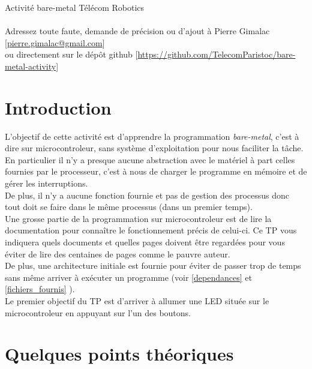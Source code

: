 \documentclass[a4paper,10pt]{article} %
\begin{document}
\LARGE
Activité bare-metal \hfill Télécom Robotics\\\\
\small Adressez toute faute, demande de précision ou d'ajout à Pierre Gimalac [\href{mailto:pierre.gimalac@gmail.com}{pierre.gimalac@gmail.com}]\\
ou directement sur le dépôt github [\href{https://github.com/TelecomParistoc/bare-metal-activity}{https://github.com/TelecomParistoc/bare-metal-activity}]

\normalsize
\renewcommand{\contentsname}{Sommaire}
\thispagestyle{empty}
\tableofcontents
\thispagestyle{empty}

\section{Introduction}
L'objectif de cette activité est d'apprendre la programmation \textit{bare-metal}, c'est à dire sur microcontroleur, sans système d'exploitation pour nous faciliter la tâche.\\

En particulier il n'y a presque aucune abstraction avec le matériel à part celles fournies par le processeur, c'est à nous de charger le programme en mémoire et de gérer les interruptions.\\

De plus, il n'y a aucune fonction fournie et pas de gestion des processus donc tout doit se faire dans le même processus (dans un premier temps).\\

Une grosse partie de la programmation sur microcontroleur est de lire la documentation pour connaître le fonctionnement précis de celui-ci. Ce TP vous indiquera quels documents et quelles pages doivent être regardées pour vous éviter de lire des centaines de pages comme le pauvre auteur.\\

De plus, une architecture initiale est fournie pour éviter de passer trop de temps sans même arriver à exécuter un programme (voir \autoref{dependances}  et \autoref{fichiers_fournis} ).\\

Le premier objectif du TP est d'arriver à allumer une LED située sur le microcontroleur en appuyant sur l'un des boutons.

\newpage

\section{Quelques points théoriques}
\end{document}
